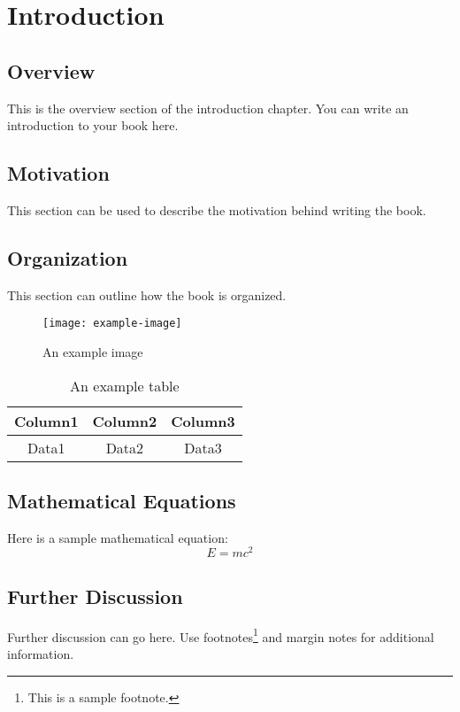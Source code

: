 \documentclass[12pt, oneside]{book}
\begin{document}
\clearpage
\chapter{Introduction}
\section{Overview}
This is the overview section of the introduction chapter. You can write an introduction to your book here.

\section{Motivation}
This section can be used to describe the motivation behind writing the book.

\section{Organization}
This section can outline how the book is organized.

\begin{figure}[h]
    \centering
    \texttt{[image: example-image]}
    \caption{An example image}
    \label{fig:example-image}
\end{figure}

\begin{table}[h]
    \centering
    \begin{tabular}{|c|c|c|}
        \hline
        Column1 & Column2 & Column3 \\
        \hline
        Data1 & Data2 & Data3 \\
        \hline
    \end{tabular}
    \caption{An example table}
    \label{tab:example-table}
\end{table}

\section{Mathematical Equations}
Here is a sample mathematical equation:
\begin{equation}
    E = mc^2
\end{equation}

\section{Further Discussion}
Further discussion can go here. Use footnotes\footnote{This is a sample footnote.} and margin notes for additional information.
\end{document}
